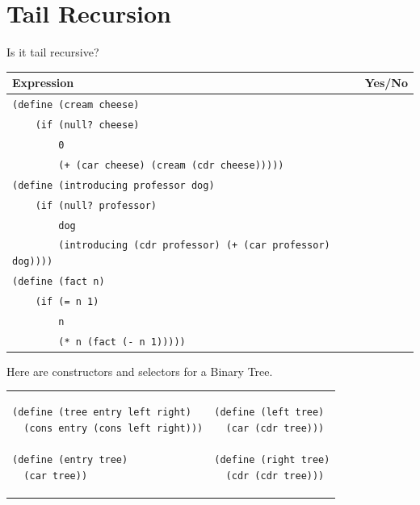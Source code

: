 \documentclass{exam}
\begin{document}
\section{Tail Recursion}
\begin{questions}

\item Is it tail recursive?
\begin{center}
    \begin{tabular}{|m{13cm}|m{1.5cm}|}
\hline
\textbf{Expression} & \textbf{Yes/No} \\
\hline
\lstinline$(define (cream cheese)$ &  \\
\lstinline$    (if (null? cheese)$ & \\ 
\lstinline$        0$ & \\
\lstinline$        (+ (car cheese) (cream (cdr cheese)))))$ & \\
\hline
\lstinline$(define (introducing professor dog)$ &  \\
\lstinline$    (if (null? professor)$ & \\ 
\lstinline$        dog$ & \\
\lstinline$        (introducing (cdr professor) (+ (car professor) dog))))$ & \\
\hline
\lstinline$(define (fact n)$ &  \\
\lstinline$    (if (= n 1)$ & \\ 
\lstinline$        n$ & \\
\lstinline$        (* n (fact (- n 1)))))$ & \\
\hline
\end{tabular}
\end{center}

\item Here are constructors and selectors for a Binary Tree.

\begin{tabular}{m{9cm} m{7cm}}
\begin{lstlisting}
(define (tree entry left right)
  (cons entry (cons left right)))

(define (entry tree)
  (car tree))
  \end{lstlisting} & 
\begin{lstlisting}
(define (left tree)
  (car (cdr tree)))

(define (right tree)
  (cdr (cdr tree)))
  \end{lstlisting}

\end{tabular}


\end{questions}
\end{document}

